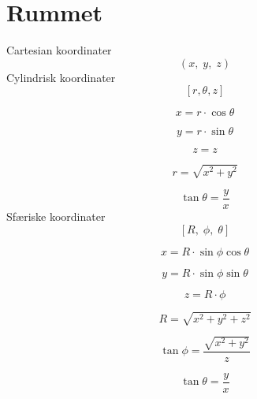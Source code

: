 \section{Rummet}
Cartesian koordinater
$$(x,\;y,\;z)$$
Cylindrisk koordinater
$$[r,\theta,z]$$

$$x=r\cdot \cos \theta $$

$$y=r\cdot \sin \theta $$

$$z=z$$

$$r=\sqrt{x^2+y^2}$$

$$\tan \theta=\frac{y}{x}$$
Sfæriske koordinater
$$[R,\;\phi,\;\theta]$$

$$x=R\cdot \sin \phi \cos \theta$$

$$y=R\cdot \sin \phi \sin \theta$$

$$z=R\cdot \phi$$

$$R=\sqrt{x^2+y^2+z^2}$$

$$\tan \phi=\frac{\sqrt{x^2+y^2}}{z}$$

$$\tan \theta=\frac{y}{x}$$
